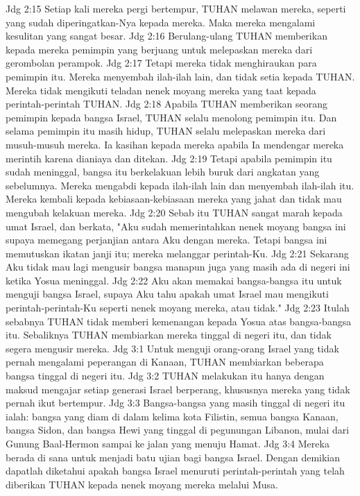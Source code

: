 Jdg 2:15  Setiap kali mereka pergi bertempur, TUHAN melawan mereka, seperti yang sudah diperingatkan-Nya kepada mereka. Maka mereka mengalami kesulitan yang sangat besar.
Jdg 2:16  Berulang-ulang TUHAN memberikan kepada mereka pemimpin yang berjuang untuk melepaskan mereka dari gerombolan perampok.
Jdg 2:17  Tetapi mereka tidak menghiraukan para pemimpin itu. Mereka menyembah ilah-ilah lain, dan tidak setia kepada TUHAN. Mereka tidak mengikuti teladan nenek moyang mereka yang taat kepada perintah-perintah TUHAN.
Jdg 2:18  Apabila TUHAN memberikan seorang pemimpin kepada bangsa Israel, TUHAN selalu menolong pemimpin itu. Dan selama pemimpin itu masih hidup, TUHAN selalu melepaskan mereka dari musuh-musuh mereka. Ia kasihan kepada mereka apabila Ia mendengar mereka merintih karena dianiaya dan ditekan.
Jdg 2:19  Tetapi apabila pemimpin itu sudah meninggal, bangsa itu berkelakuan lebih buruk dari angkatan yang sebelumnya. Mereka mengabdi kepada ilah-ilah lain dan menyembah ilah-ilah itu. Mereka kembali kepada kebiasaan-kebiasaan mereka yang jahat dan tidak mau mengubah kelakuan mereka.
Jdg 2:20  Sebab itu TUHAN sangat marah kepada umat Israel, dan berkata, "Aku sudah memerintahkan nenek moyang bangsa ini supaya memegang perjanjian antara Aku dengan mereka. Tetapi bangsa ini memutuskan ikatan janji itu; mereka melanggar perintah-Ku.
Jdg 2:21  Sekarang Aku tidak mau lagi mengusir bangsa manapun juga yang masih ada di negeri ini ketika Yosua meninggal.
Jdg 2:22  Aku akan memakai bangsa-bangsa itu untuk menguji bangsa Israel, supaya Aku tahu apakah umat Israel mau mengikuti perintah-perintah-Ku seperti nenek moyang mereka, atau tidak."
Jdg 2:23  Itulah sebabnya TUHAN tidak memberi kemenangan kepada Yosua atas bangsa-bangsa itu. Sebaliknya TUHAN membiarkan mereka tinggal di negeri itu, dan tidak segera mengusir mereka.
Jdg 3:1  Untuk menguji orang-orang Israel yang tidak pernah mengalami peperangan di Kanaan, TUHAN membiarkan beberapa bangsa tinggal di negeri itu.
Jdg 3:2  TUHAN melakukan itu hanya dengan maksud mengajar setiap generasi Israel berperang, khususnya mereka yang tidak pernah ikut bertempur.
Jdg 3:3  Bangsa-bangsa yang masih tinggal di negeri itu ialah: bangsa yang diam di dalam kelima kota Filistin, semua bangsa Kanaan, bangsa Sidon, dan bangsa Hewi yang tinggal di pegunungan Libanon, mulai dari Gunung Baal-Hermon sampai ke jalan yang menuju Hamat.
Jdg 3:4  Mereka berada di sana untuk menjadi batu ujian bagi bangsa Israel. Dengan demikian dapatlah diketahui apakah bangsa Israel menuruti perintah-perintah yang telah diberikan TUHAN kepada nenek moyang mereka melalui Musa.
